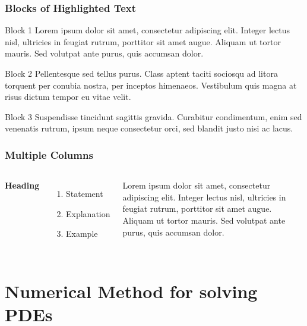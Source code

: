 \documentclass{beamer}
\begin{document}
\begin{frame}
\frametitle{Blocks of Highlighted Text}
\begin{block}{Block 1}
Lorem ipsum dolor sit amet, consectetur adipiscing elit. Integer lectus nisl, ultricies in feugiat rutrum, porttitor sit amet augue. Aliquam ut tortor mauris. Sed volutpat ante purus, quis accumsan dolor.
\end{block}

\begin{block}{Block 2}
Pellentesque sed tellus purus. Class aptent taciti sociosqu ad litora torquent per conubia nostra, per inceptos himenaeos. Vestibulum quis magna at risus dictum tempor eu vitae velit.
\end{block}

\begin{block}{Block 3}
Suspendisse tincidunt sagittis gravida. Curabitur condimentum, enim sed venenatis rutrum, ipsum neque consectetur orci, sed blandit justo nisi ac lacus.
\end{block}
\end{frame}


\begin{frame}
\frametitle{Multiple Columns}
\begin{columns}[c] %

\textbf{Heading}
\begin{enumerate}
\item Statement
\item Explanation
\item Example
\end{enumerate}

Lorem ipsum dolor sit amet, consectetur adipiscing elit. Integer lectus nisl, ultricies in feugiat rutrum, porttitor sit amet augue. Aliquam ut tortor mauris. Sed volutpat ante purus, quis accumsan dolor.

\end{columns}
\end{frame}

\section{Numerical Method for solving PDEs}
\end{document}
